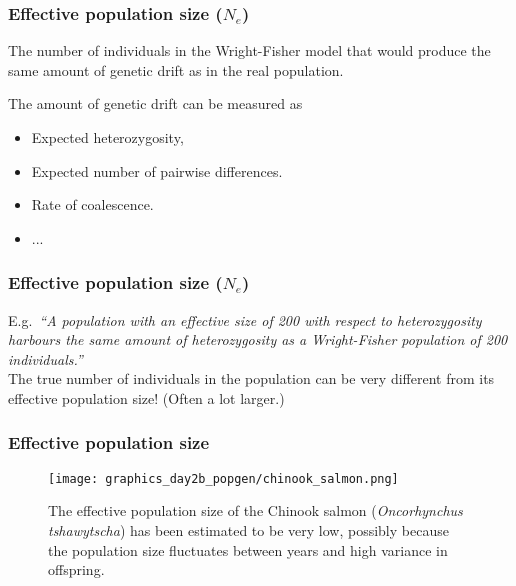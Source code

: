 \documentclass{beamer}
\newcommand{\1}{\ensuremath{\mathbf{1}}}
\begin{document}
%
%
%
\begin{frame}\frametitle{Effective population size ($N_e$)}
	\begin{block}{}
		The number of individuals in the Wright-Fisher model that would produce the same amount of genetic drift as in the real population.
	\end{block}
	The amount of genetic drift can be measured as
	\begin{itemize}
		\item Expected heterozygosity,
		\item Expected number of pairwise differences.
		\item Rate of coalescence.
		\item ...
	\end{itemize}
\end{frame}
%
%
%
\begin{frame}\frametitle{Effective population size ($N_e$)}
	E.g.\ \emph{``A population with an effective size of 200 with respect to heterozygosity harbours the same amount of heterozygosity as a Wright-Fisher population of 200 individuals.''}\\[2ex]
	The true number of individuals in the population can be very different from its effective population size! (Often a lot larger.)
\end{frame}
%
%
%
\begin{frame}\frametitle{Effective population size}
	\begin{figure}
	\begin{center}
		\texttt{[image: graphics\_day2b\_popgen/chinook\_salmon.png]}
	\end{center}
	\caption{The effective population size of the Chinook salmon (\emph{Oncorhynchus tshawytscha}) has been estimated to be very low, possibly because the population size fluctuates between years and high variance in offspring.}
	\end{figure}
\end{frame}
\end{document}
